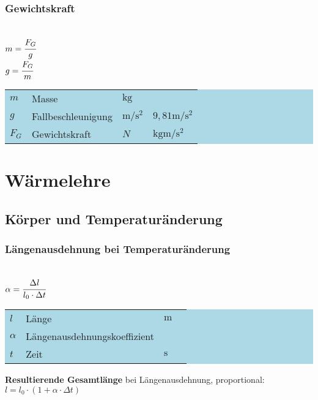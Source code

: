 \documentclass[a4paper, 11pt]{article}
\newcommand\mainformular[1]{\fbox{#1}}      %
\newcommand\legende[1]{
    \colorbox{lightblue}{%
    \begin{tabular}{llll}
     #1
    \end{tabular}
    }
}                                           %
\begin{document}
\subsubsection{Gewichtskraft}
\begin{minipage}{0.45\textwidth}

\mainformular{$F_G = m \cdot g$} \\
$m = \cfrac{F_G}{g}$ \\
$g = \cfrac{F_G}{m}$

\end{minipage}
\begin{minipage}{0.45\textwidth}

\legende{
$m$ & Masse & $\si{\kilo\gram}$ & \\
$g$ & Fallbeschleunigung & $\si{\metre\per\square\second}$ & $9,81 \si{\metre\per\square\second}$ \\
$F_G$ & Gewichtskraft & $N$ & $\si{\kilogram\metre\per\square\second}$ \\
}

\end{minipage}

\section{Wärmelehre}

\subsection{Körper und Temperaturänderung}
\subsubsection{Längenausdehnung bei Temperaturänderung}
\begin{minipage}{0.45\textwidth}
\mainformular{$\Delta l = \alpha \cdot l_0 \cdot \Delta t$}  \\
$\alpha = \cfrac{\Delta l}{l_0 \cdot \Delta t}$
\end{minipage}
\begin{minipage}{0.45\textwidth}

\legende{
$l$ & Länge & $\si{\meter} $ & $ $ \\
$\alpha$ & Längenausdehnungskoeffizient &  & \\
$t$ & Zeit & $\si{\second}$ & \\
}

\end{minipage}

\textbf{Resultierende Gesamtlänge} bei Längenausdehnung, proportional: \\
$l = l_{0} \cdot \left( 1 + \alpha \cdot \Delta t \right) $
\end{document}
